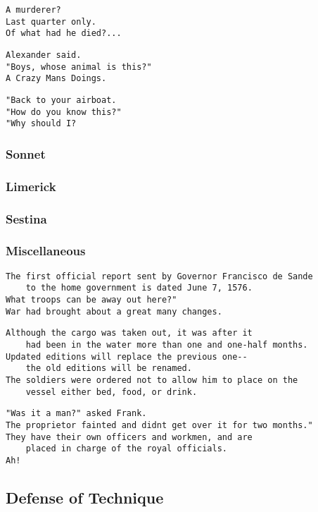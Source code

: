 \documentclass[10pt]{article}
\begin{document}
\begin{verbatim}
A murderer?
Last quarter only.
Of what had he died?...
\end{verbatim}

\begin{verbatim}
Alexander said. 
"Boys, whose animal is this?" 
A Crazy Mans Doings.
\end{verbatim}

\begin{verbatim}
"Back to your airboat. 
"How do you know this?" 
"Why should I?
\end{verbatim}
\subsubsection{Sonnet}
\subsubsection{Limerick}
\subsubsection{Sestina}
\subsubsection{Miscellaneous}
\begin{verbatim}
The first official report sent by Governor Francisco de Sande
    to the home government is dated June 7, 1576.
What troops can be away out here?"
War had brought about a great many changes.
\end{verbatim}

\begin{verbatim}
Although the cargo was taken out, it was after it 
    had been in the water more than one and one-half months.
Updated editions will replace the previous one--
    the old editions will be renamed.
The soldiers were ordered not to allow him to place on the 
    vessel either bed, food, or drink.
\end{verbatim}

\begin{verbatim}
"Was it a man?" asked Frank.
The proprietor fainted and didnt get over it for two months."
They have their own officers and workmen, and are 
    placed in charge of the royal officials.
Ah!
\end{verbatim}

\subsection{Defense of Technique}
\end{document}
